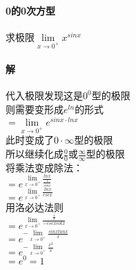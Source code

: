 \documentclass{article}
\begin{document}
\begin{flushleft}
	\paragraph{0的0次方型}
	求极限$\lim\limits_{x\to 0^+}x^{sinx}$
	\paragraph{解}
	代入极限发现这是$0^0$型的极限\\
	则需要变形成$e^{ln}$的形式\\
	$=\lim\limits_{x\to 0^+}e^{sinx\cdot lnx}$\\
	此时变成了$0\cdot\infty$型的极限\\
	所以继续化成$\frac{0}{0}$或$\frac{\infty}{\infty}$型的极限\\
	将乘法变成除法：\\
	$=e^{\lim\limits_{x\to 0^+}\frac{lnx}{\frac{1}{sinx}}}$\\
	$=e^{\lim\limits_{x\to 0^+}\frac{lnx}{cscx}}$\\
	用洛必达法则\\
	$=e^{\lim\limits_{x\to 0^+}\frac{\frac{1}{x}}{-cscxcotx}}$\\
	$=e^{-\lim\limits_{x\to 0^+}\frac{sinxtanx}{x}}$\\
	$=e^{-\lim\limits_{x\to 0^+}\frac{x^2}{x}}$\\
	$=e^0=1$\\
	

\end{flushleft}
\end{document}
